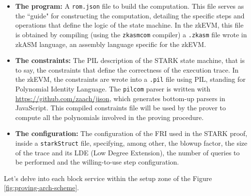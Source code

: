 \begin{itemize}

\item \textbf{The program:} A \texttt{rom.json} file to build the computation.  This file serves as the ``guide" for constructing the computation, detailing the specific steps and operations that define the logic of the state machine. In the zkEVM, this file is obtained by compiling (using the \texttt{zkasmcom} compiler) a \texttt{.zkasm} file wrote in zkASM language, an assembly language specific for the zkEVM.

\item \textbf{The constraints:} The PIL description of the STARK state machine, that is to say, the constraints that define the correctness of the execution trace. In the zkEVM, the constraints are wrote into a \texttt{.pil} file using PIL, standing for Polynomial Identity Language. The \texttt{pilcom} parser is written with \url{https://github.com/zaach/jison}, which generates bottom-up parsers in JavaScript. This compiled constraints file will be used by the prover to compute all the polynomials involved in the proving procedure.

\item \textbf{The configuration:} The configuration of the FRI used in the STARK proof, inside a \texttt{starkStruct} file, specifying, among other, the blowup factor, the size of the trace and its LDE (Low Degree Extension), the number of queries to be performed and the willing-to-use step configuration.

\end{itemize}

Let's delve into each block service within the setup zone of the Figure \ref{fig:proving-arch-scheme}.

